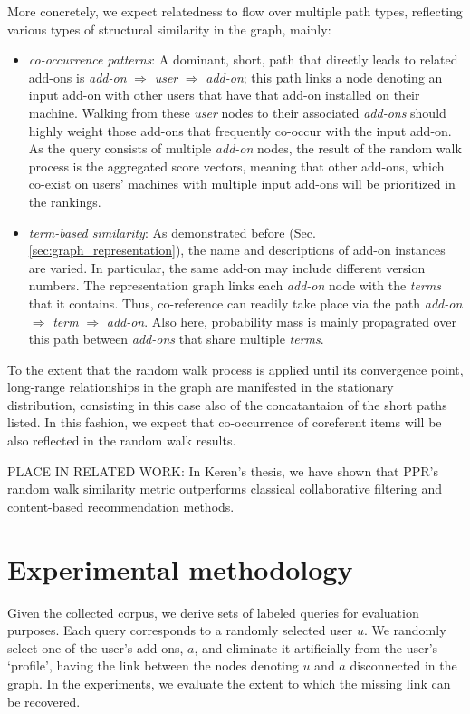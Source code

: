 \documentclass[11pt,oneside]{book}
\let\Oldsection\section
\renewcommand{\section}{\FloatBarrier\Oldsection}
\begin{document}
More concretely, we expect relatedness to flow over multiple path
types, reflecting various types of structural similarity in the graph,
mainly:
\begin{itemize}
\item {\it co-occurrence patterns}: A dominant, short, path that
  directly leads to related add-ons is {\it add-on} $\Rightarrow$ {\it user}
   $\Rightarrow$ {\it add-on}; this path links a node denoting an input add-on
  with other users that have that add-on installed on their
  machine. Walking from these {\it user} nodes to their associated
  {\it add-ons} should highly weight those add-ons that frequently
  co-occur with the input add-on. As the query consists of multiple
  {\it add-on} nodes, the result of the random walk process is the
  aggregated score vectors, meaning that other add-ons, which co-exist
  on users' machines with multiple input add-ons will be prioritized
  in the rankings. 
\item {\it term-based similarity}: As demonstrated before
  (Sec. \autoref{sec:graph_representation}), the name and descriptions of add-on
  instances are varied. In particular, the same add-on may include
  different version numbers. The representation graph links each {\it
    add-on} node with the {\it terms} that it contains. Thus,
  co-reference can readily take place via the path {\it add-on}
  $\Rightarrow$ {\it term} $\Rightarrow$ {\it add-on}. Also here,
  probability mass is mainly propagrated over this path between {\it
    add-ons} that share multiple {\it terms}.
\end{itemize}

To the extent that the random walk process is applied until its
convergence point, long-range relationships in the graph are
manifested in the stationary distribution, consisting in this case
also of the concatantaion of the short paths listed. In this fashion,
we expect that co-occurrence of coreferent items will be also
reflected in the random walk results.

PLACE IN RELATED WORK: In Keren's thesis, we have shown that PPR's
random walk similarity metric outperforms classical collaborative
filtering and content-based recommendation methods.


\section{Experimental methodology}

Given the collected corpus, we derive sets of labeled queries for evaluation purposes.  Each query corresponds to a randomly selected user $u$. We randomly select one of the user's add-ons, $a$, and eliminate it artificially from the user's `profile', having the link between the nodes denoting $u$ and $a$ disconnected in the graph. In
the experiments, we evaluate the extent to which the missing link can
be recovered. 
\end{document}
